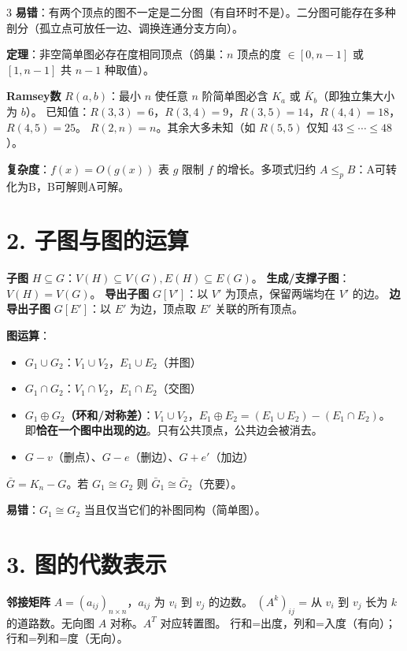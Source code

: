 \documentclass[10pt,a4paper,landscape]{ctexart}
\begin{document}
\begin{multicols}{3}
\textbf{易错}：有两个顶点的图不一定是二分图（有自环时不是）。二分图可能存在多种剖分（孤立点可放任一边、调换连通分支方向）。

\textbf{定理}：非空简单图必存在度相同顶点（鸽巢：$n$ 顶点的度 $\in[0,n-1]$ 或 $[1,n-1]$ 共 $n-1$ 种取值）。

\textbf{Ramsey数} $R(a,b)$：最小 $n$ 使任意 $n$ 阶简单图必含 $K_a$ 或 $\bar{K}_b$（即独立集大小为 $b$）。
已知值：$R(3,3)=6$，$R(3,4)=9$，$R(3,5)=14$，$R(4,4)=18$，$R(4,5)=25$。
$R(2,n)=n$。其余大多未知（如 $R(5,5)$ 仅知 $43\leq\cdots\leq 48$）。

\textbf{复杂度}：$f(x)=O(g(x))$ 表 $g$ 限制 $f$ 的增长。多项式归约 $A\leq_p B$：A可转化为B，B可解则A可解。

\section*{2. 子图与图的运算}

\textbf{子图} $H\subseteq G$：$V(H)\subseteq V(G),E(H)\subseteq E(G)$。
\textbf{生成/支撑子图}：$V(H)=V(G)$。
\textbf{导出子图} $G[V']$：以 $V'$ 为顶点，保留两端均在 $V'$ 的边。
\textbf{边导出子图} $G[E']$：以 $E'$ 为边，顶点取 $E'$ 关联的所有顶点。

\textbf{图运算}：
\begin{itemize}
\item $G_1\cup G_2$：$V_1\cup V_2$，$E_1\cup E_2$（并图）
\item $G_1\cap G_2$：$V_1\cap V_2$，$E_1\cap E_2$（交图）
\item \textbf{$G_1\oplus G_2$（环和/对称差）}：$V_1\cup V_2$，$E_1\oplus E_2=(E_1\cup E_2)-(E_1\cap E_2)$。
  即\textbf{恰在一个图中出现的边}。只有公共顶点，公共边会被消去。
\item $G-v$（删点）、$G-e$（删边）、$G+e'$（加边）
\end{itemize}
$\bar{G}=K_n-G$。若 $G_1\cong G_2$ 则 $\bar{G}_1\cong\bar{G}_2$（充要）。

\textbf{易错}：$G_1\cong G_2$ 当且仅当它们的补图同构（简单图）。

\section*{3. 图的代数表示}

\textbf{邻接矩阵} $A=(a_{ij})_{n\times n}$，$a_{ij}$ 为 $v_i$ 到 $v_j$ 的边数。
$(A^k)_{ij}$ = 从 $v_i$ 到 $v_j$ 长为 $k$ 的道路数。无向图 $A$ 对称。$A^T$ 对应转置图。
行和=出度，列和=入度（有向）；行和=列和=度（无向）。


\end{multicols}
\end{document}
